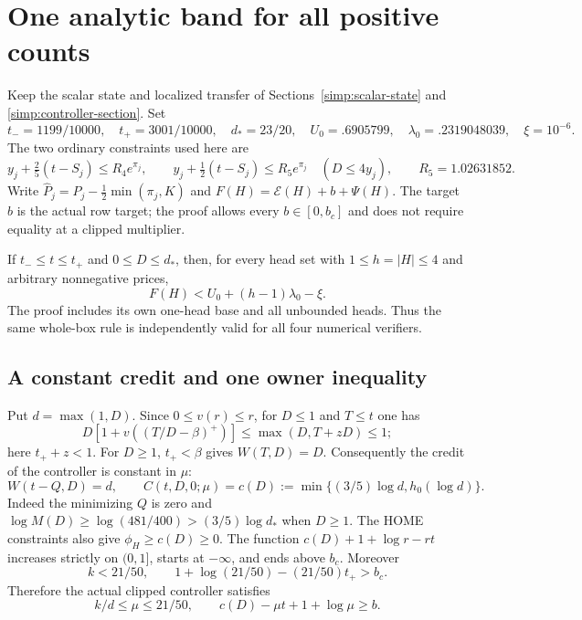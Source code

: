 \section{One analytic band for all positive counts}\label{simp:scalar-band}

Keep the scalar state and localized transfer of
Sections~\ref{simp:scalar-state} and \ref{simp:controller-section}.
Set
\[
 t_-=1199/10000,\quad t_+=3001/10000,\quad d_*=23/20,
 \quad U_0=.6905799,\quad\lambda_0=.2319048039,\quad\xi=10^{-6}.
\]
The two ordinary constraints used here are
\[
 y_j+\tfrac25(t-S_j)\le R_4e^{\pi_j},\qquad
 y_j+\tfrac12(t-S_j)\le R_5e^{\pi_j}\quad(D\le4y_j),
 \qquad R_5=1.02631852.
\]
Write $\widehat P_j=P_j-\frac12\min(\pi_j,K)$ and
$F(H)=\mathcal E(H)+b+\Psi(H)$.
The target $b$ is the actual row target; the proof allows every
$b\in[0,b_c]$ and does not require equality at a clipped multiplier.

\begin{theorem}\label{simp:band}
If $t_-\le t\le t_+$ and $0\le D\le d_*$, then, for every
head set with $1\le h=|H|\le4$ and arbitrary nonnegative prices,
\begin{equation}\label{simp:band-result}
 F(H)<U_0+(h-1)\lambda_0-\xi.
\end{equation}
The proof includes its own one-head base and all unbounded heads.
Thus the same whole-box rule is independently valid for all four
numerical verifiers.
\end{theorem}

\subsection{A constant credit and one owner inequality}

Put $d=\max(1,D)$. Since $0\le v(r)\le r$, for $D\le1$
and $T\le t$ one has
\[
 D[1+v((T/D-\beta)^+)]\le\max(D,T+zD)\le1;
\]
here $t_++z<1$. For $D\ge1$, $t_+<\beta$ gives $W(T,D)=D$.
Consequently the credit of the controller is constant in $\mu$:
\begin{equation}\label{simp:band-credit}
 W(t-Q,D)=d,\qquad
 C(t,D,0;\mu)=c(D):=\min\{(3/5)\log d,h_0(\log d)\}.
\end{equation}
Indeed the minimizing $Q$ is zero and
$\log M(D)\ge\log(481/400)>(3/5)\log d_*$ when $D\ge1$.
The HOME constraints also give $\phi_H\ge c(D)\ge0$.
The function $c(D)+1+\log r-rt$ increases strictly on $(0,1]$,
starts at $-\infty$, and ends above $b_c$.
Moreover
\[
 k<21/50,\qquad
 1+\log(21/50)-(21/50)t_+>b_c.
\]
Therefore the actual clipped controller satisfies
\begin{equation}\label{simp:band-mu}
 k/d\le\mu\le21/50,
 \qquad c(D)-\mu t+1+\log\mu\ge b.
\end{equation}

